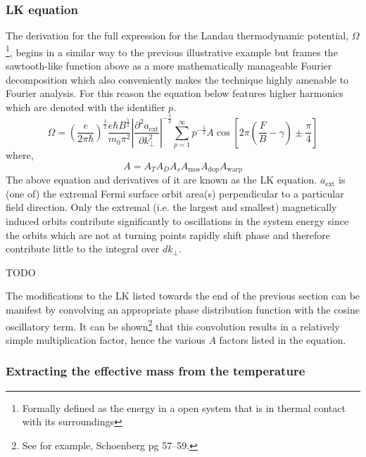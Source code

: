 \subsubsection{\ac{LK} equation}

The derivation for the full expression for the Landau thermodynamic potential, $\Omega$\footnote{Formally defined as the energy in a open system that is in thermal contact with its surroundings}, begins in a similar way to the previous illustrative example but frames the sawtooth-like function above as a more mathematically manageable Fourier decomposition which also conveniently makes the technique highly amenable to Fourier analysis. For this reason the equation below features higher harmonics which are denoted with the identifier $p$.
\begin{equation}
\Omega = \left(\frac{e}{2\pi\hbar}\right)^{\frac{3}{2}}\frac{e\hbar B^{\frac{5}{2}}}{m_0 \pi^2}\left| \frac{\partial^2 a_{\textrm{ext}}}{\partial k^2_\perp}\right|^{-\frac{1}{2}}\sum_{p=1}^{\infty}p^{-\frac{5}{2}}A\cos\left[2\pi\left(\frac{F}{B} - \gamma\right)\pm\frac{\pi}{4}\right]
\end{equation}
where,
\begin{equation}
A = A_T A_D A_s A_{\textrm{mos}} A_{\textrm{dop}} A_{\textrm{warp}} 
\end{equation}
The above equation and derivatives of it are known as the \ac{LK} equation. $a_{\textrm{ext}}$ is (one of) the extremal Fermi surface orbit area(s) perpendicular to a particular field direction. Only the extremal (i.e. the largest and smallest) magnetically induced orbits contribute significantly to oscillations in the system energy since the orbits which are not at turning points rapidly shift phase and therefore contribute little to the integral over $dk_\perp$.

TODO

The modifications to the \ac{LK} listed towards the end of the previous section can be manifest by convolving an appropriate phase distribution function with the cosine oscillatory term. It can be shown\footnote{See for example, Schoenberg pg 57--59.\cite{Schoenberg1984}} that this convolution results in a relatively simple multiplication factor, hence the various $A$ factors listed in the equation.


\subsubsection{Extracting the effective mass from the temperature}


